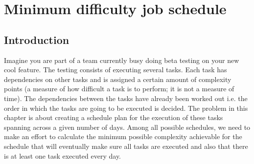 %

\chapter{Minimum difficulty job schedule}
\label{ch:min_difficulty_job_scheduler}
\section*{Introduction}
Imagine you are part of a team currently busy doing beta testing on your new cool feature. The
testing consists of executing several tasks. Each task has dependencies on other tasks and is
assigned a certain amount of complexity points (a measure of how difficult a task is to
perform; it is not a measure of time). The dependencies between the tasks have already been worked
out i.e. the order in which the tasks are going to be executed is decided. The problem in this
chapter is about creating a schedule plan for the execution of these tasks spanning across a
given number of days. Among all possible schedules, we need to make an effort to calculate the
minimum possible complexity achievable for the schedule that will eventually make sure all tasks are
executed and also that there is at least one task executed every day.


